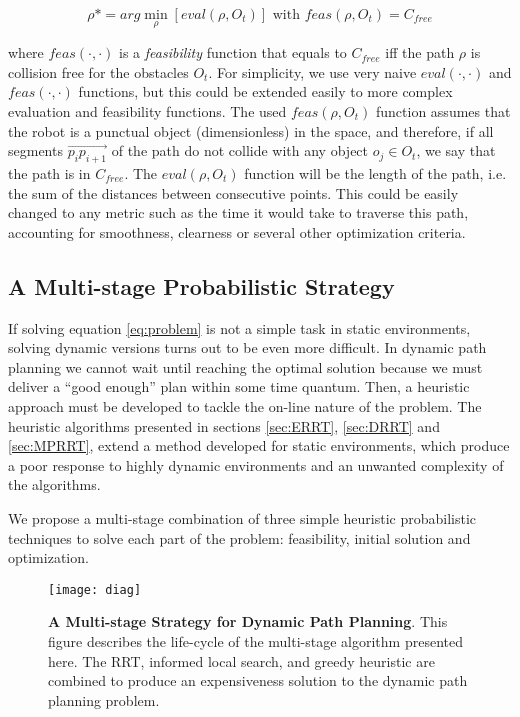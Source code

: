 \documentclass[10pt, conference, compsoc]{IEEEtran}
\begin{document}
\begin{equation}
\displaystyle\rho*=arg\min_{\rho}[eval(\rho,O_t)]  \textrm{ with }  feas(\rho,O_t) = C_{free}
\label{eq:problem}
\end{equation}

where $feas(\cdot,\cdot)$ is a \emph{feasibility} function that equals to $C_{free}$
iff the path $\rho$ is collision free for the obstacles $O_t$.
For simplicity, we use very naive $eval(\cdot,\cdot)$ and $feas(\cdot,\cdot)$
functions, but this could be extended easily to more complex evaluation and
feasibility functions. 
The used $feas(\rho,O_t)$ function assumes that the robot is a punctual
object (dimensionless) in the space, and therefore, if all segments $\overrightarrow{p_i p_{i+1}}$
of the path do not collide with any object $o_j \in O_t$, we say that the path
is in $C_{free}$.
The $eval(\rho,O_t)$ function will be the length of the path, i.e. the sum of the distances between
consecutive points. This could be easily changed to any metric such as the time
it would take to traverse this path, accounting for smoothness,
clearness or several other optimization criteria.


\subsection{A Multi-stage Probabilistic Strategy}

If solving equation \ref{eq:problem} is not a simple task in static environments,
solving dynamic versions turns out to be even more difficult. In dynamic path planning 
we cannot wait until reaching the optimal solution because we must deliver
a ``good enough'' plan within some time quantum. Then, a heuristic approach 
must be developed to tackle the on-line nature of the problem. The heuristic
algorithms presented in sections \ref{sec:ERRT}, \ref{sec:DRRT} and \ref{sec:MPRRT},
extend a method developed for static environments, which produce a poor response
to highly dynamic environments and an unwanted complexity of the algorithms.

We propose a multi-stage combination of three simple heuristic probabilistic techniques
to solve each part of the problem: feasibility, initial solution and optimization.

\begin{figure}[ht]
\begin{center}
\texttt{[image: diag]}
\caption[\textbf{A Multi-stage Strategy for Dynamic Path Planning}]{\textbf{A Multi-stage Strategy for Dynamic Path Planning}. This figure describes
the life-cycle of the multi-stage algorithm presented here. The RRT, informed local search, and greedy heuristic are combined
to produce an expensiveness solution to the dynamic path planning problem.}
\label{fig:diag}
\end{center}
\end{figure}
\end{document}
